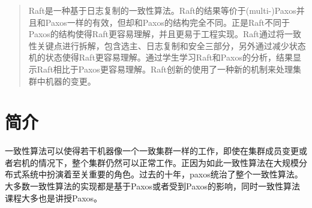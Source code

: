 \documentclass[journal]{IEEEtran}
\begin{document}







\maketitle

\begin{abstract}
Raft是一种基于日志复制的一致性算法。Raft的结果等价于(multi-)Paxos并且和Paxos一样的有效，但却和Paxos的结构完全不同。正是Raft不同于Paxos的结构使得Raft更容易理解，并且更易于工程实现。Raft通过将一致性关键点进行拆解，包含选主、日志复制和安全三部分，另外通过减少状态机的状态使得Raft更容易理解。通过学生学习Raft和Paxos的分析，结果显示Raft相比于Paxos更容易理解。Raft创新的使用了一种新的机制来处理集群中机器的变更。
\end{abstract}







%
\IEEEpeerreviewmaketitle



\section{简介}
% 
% 
% 
% 
一致性算法可以使得若干机器像一个一致集群一样的工作，即使在集群成员变更或者宕机的情况下，整个集群仍然可以正常工作。正因为如此一致性算法在大规模分布式系统中扮演着至关重要的角色。过去的十年，paxos统治了整个一致性算法。大多数一致性算法的实现都是基于Paxos或者受到Paxos的影响，同时一致性算法课程大多也是讲授Paxos。
\end{document}
